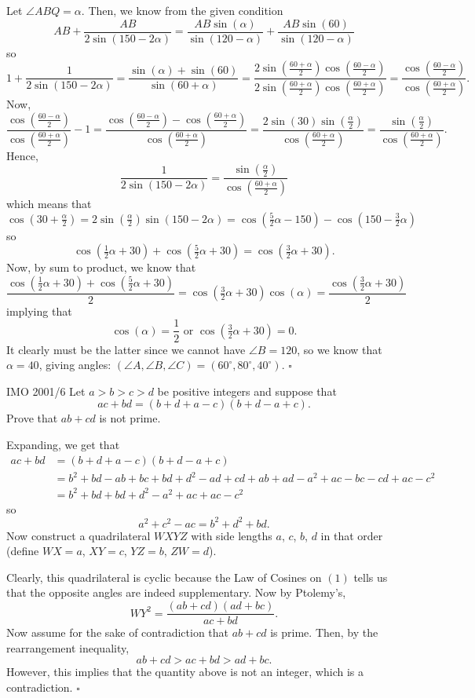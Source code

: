 \documentclass{article}
\begin{document}
Let $\angle ABQ = \alpha$. Then, we know from the given condition \[AB+\dfrac{AB}{2\sin(150-2\alpha)} = \dfrac{AB\sin(\alpha)}{\sin(120-\alpha)}+\dfrac{AB\sin(60)}{\sin(120-\alpha)}\] so \[1+\dfrac{1}{2\sin(150-2\alpha)} = \dfrac{\sin(\alpha)+\sin(60)}{\sin(60+\alpha)} = \dfrac{2\sin(\tfrac{60+\alpha}{2})\cos(\tfrac{60-\alpha}{2})}{2\sin(\tfrac{60+\alpha}{2})\cos(\tfrac{60+\alpha}{2})} = \dfrac{\cos(\tfrac{60-\alpha}{2})}{\cos(\tfrac{60+\alpha}{2})}.\] Now, \[\dfrac{\cos(\tfrac{60-\alpha}{2})}{\cos(\tfrac{60+\alpha}{2})} - 1 = \dfrac{\cos(\tfrac{60-\alpha}{2})-\cos(\tfrac{60+\alpha}{2})}{\cos(\tfrac{60+\alpha}{2})} = \dfrac{2\sin(30)\sin(\tfrac{\alpha}{2})}{\cos(\tfrac{60+\alpha}{2})} = \dfrac{\sin(\tfrac{\alpha}{2})}{\cos(\tfrac{60+\alpha}{2})}.\] Hence, \[\dfrac{1}{2\sin(150-2\alpha)} = \dfrac{\sin(\tfrac{\alpha}{2})}{\cos(\tfrac{60+\alpha}{2})}\] which means that \[\cos(30+\tfrac{\alpha}{2}) = 2\sin(\tfrac{\alpha}{2})\sin(150-2\alpha) = \cos(\tfrac{5}{2}\alpha-150)-\cos(150-\tfrac{3}{2}\alpha)\] so \[\cos(\tfrac{1}{2}\alpha+30)+\cos(\tfrac{5}{2}\alpha+30) = \cos(\tfrac{3}{2}\alpha+30).\] Now, by sum to product, we know that \[\dfrac{\cos(\tfrac{1}{2}\alpha+30)+\cos(\tfrac{5}{2}\alpha+30)}{2} = \cos(\tfrac{3}{2}\alpha+30)\cos(\alpha) = \dfrac{\cos(\tfrac{3}{2}\alpha+30)}{2}\] implying that \[\cos(\alpha) = \dfrac{1}{2} \text{ or } \cos(\tfrac{3}{2}\alpha+30) = 0.\] It clearly must be the latter since we cannot have $\angle B = 120$, so we know that $\alpha = 40$, giving angles: $(\angle A, \angle B, \angle C) = \boxed{(60^\circ, 80^\circ, 40^\circ)}$. $\square$

\begin{problem}[5.30]{IMO 2001/6}
Let $a>b>c>d$ be positive integers and suppose that \[ac + bd = (b + d + a - c)(b + d - a + c).\] Prove that $ab + cd$ is not prime.
\end{problem}

Expanding, we get that 
\begin{align*}
ac+bd &= (b + d + a - c)(b + d - a + c) \\
&= b^2+bd-ab+bc+bd+d^2-ad+cd+ab+ad-a^2+ac-bc-cd+ac-c^2 \\
&= b^2+bd+bd+d^2-a^2+ac+ac-c^2
\end{align*}
so \[a^2+c^2-ac = b^2+d^2+bd. \tag{1}\] Now construct a quadrilateral $WXYZ$ with side lengths $a$, $c$, $b$, $d$ in that order (define $WX = a$, $XY = c$, $YZ = b$, $ZW = d$). 

Clearly, this quadrilateral is cyclic because the Law of Cosines on $(1)$ tells us that the opposite angles are indeed supplementary. Now by Ptolemy's, \[WY^2 = \dfrac{(ab+cd)(ad+bc)}{ac+bd}.\] Now assume for the sake of contradiction that $ab+cd$ is prime. Then, by the rearrangement inequality, \[ab+cd > ac+bd > ad+bc.\] However, this implies that the quantity above is not an integer, which is a contradiction. $\square$
\end{document}
